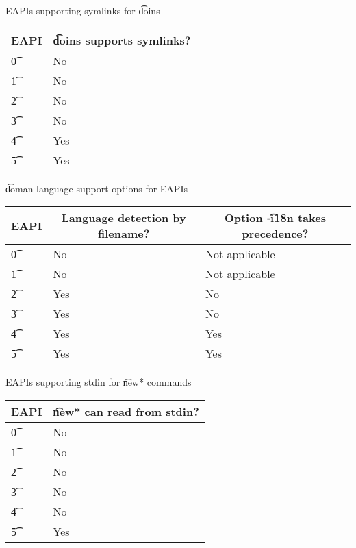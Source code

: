 \begin{centertable}{EAPIs supporting symlinks for \t{doins}} \label{tab:doins-table}
    \begin{tabular}{ l l }
        \toprule
            \multicolumn{1}{c}{\textbf{EAPI}} &
            \multicolumn{1}{c}{\textbf{\t{doins} supports symlinks?}} \\
            \midrule
    \t{0} & No \\
    \t{1} & No \\
    \t{2} & No \\
    \t{3} & No \\
    \t{4} & Yes \\
    \t{5} & Yes \\
    \bottomrule
    \end{tabular}
\end{centertable}

\begin{centertable}{\t{doman} language support options for EAPIs}
    \label{tab:doman-table}
    \begin{tabular}{ l l l }
        \toprule
            \multicolumn{1}{c}{\textbf{EAPI}} &
            \multicolumn{1}{c}{\textbf{Language detection by filename?}} &
            \multicolumn{1}{c}{\textbf{Option \t{-i18n} takes precedence?}} \\
            \midrule
    \t{0} & No & Not applicable \\
    \t{1} & No & Not applicable \\
    \t{2} & Yes & No \\
    \t{3} & Yes & No \\
    \t{4} & Yes & Yes \\
    \t{5} & Yes & Yes \\
    \bottomrule
    \end{tabular}
\end{centertable}

\begin{centertable}{EAPIs supporting stdin for \t{new*} commands} \label{tab:newfoo-stdin-table}
    \begin{tabular}{ l l }
        \toprule
            \multicolumn{1}{c}{\textbf{EAPI}} &
            \multicolumn{1}{c}{\textbf{\t{new*} can read from stdin?}} \\
            \midrule
    \t{0} & No \\
    \t{1} & No \\
    \t{2} & No \\
    \t{3} & No \\
    \t{4} & No \\
    \t{5} & Yes \\
    \bottomrule
    \end{tabular}
\end{centertable}


